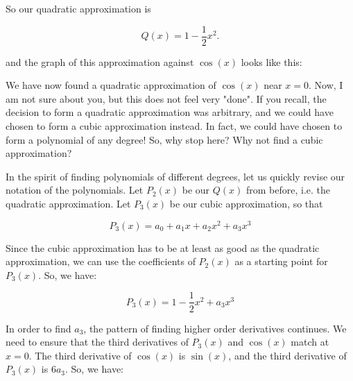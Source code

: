 \documentclass{article}
\begin{document}
So our quadratic approximation is

$$
Q(x) = 1 - \frac{1}{2}x^2.
$$

and the graph of this approximation against $\cos(x)$ looks like this:

\begin{center}
\end{center}

We have now found a quadratic approximation of $\cos(x)$ near $x=0$. Now, I am not sure about you, but this does not feel very "done". If you recall, the decision to form a quadratic approximation was arbitrary, and we could have chosen to form a cubic approximation instead. In fact, we could have chosen to form a polynomial of any degree! So, why stop here? Why not find a cubic approximation?

In the spirit of finding polynomials of different degrees, let us quickly revise our notation of the polynomials. Let $P_2(x)$ be our $Q(x)$ from before, i.e. the quadratic approximation. Let $P_3(x)$ be our cubic approximation, so that

$$ P_3(x) = a_0 + a_1 x + a_2 x^2 + a_3 x^3 $$

Since the cubic approximation has to be at least as good as the quadratic approximation, we can use the coefficients of $P_2(x)$ as a starting point for $P_3(x)$. So, we have:

$$ P_3(x) = 1 - \frac{1}{2} x^2 + a_3 x^3 $$

In order to find $a_3$, the pattern of finding higher order derivatives continues. We need to ensure that the third derivatives of $P_3(x)$ and $\cos(x)$ match at $x=0$. The third derivative of $\cos(x)$ is $\sin(x)$, and the third derivative of $P_3(x)$ is $6a_3$. So, we have:
\end{document}
